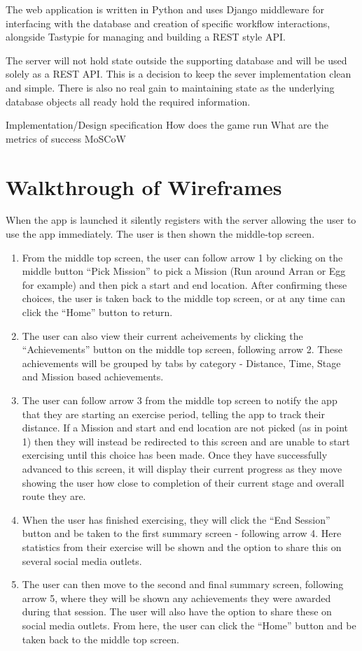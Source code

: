 The web application is written in Python and uses Django middleware
for interfacing with the database and creation of specific workflow
interactions, alongside Tastypie for managing and building a REST
style API.

The server will not hold state outside the supporting database and
will be used solely as a REST API. This is a decision to keep the
sever implementation clean and simple. There is also no real gain to
maintaining state as the underlying database objects all ready hold
the required information.

Implementation/Design specification
How does the game run
What are the metrics of success
MoSCoW


\section{Walkthrough of Wireframes}
When the app is launched it silently registers with the server
allowing the user to use the app immediately. The user is then shown
the middle-top screen.
\begin{enumerate}
  \item From the middle top screen, the user can follow arrow 1 by
    clicking on the middle button ``Pick Mission'' to pick a Mission
    (Run around Arran or Egg for example) and then pick a start and
    end location. After confirming these choices, the user is taken
    back to the middle top screen, or at any time can click the
    ``Home'' button to return. 
  \item The user can also view their current acheivements by clicking
    the ``Achievements'' button on the middle top screen, following
    arrow 2. These achievements will be grouped by tabs by category -
    Distance, Time, Stage and Mission based achievements.
  \item The user can follow arrow 3 from the middle top screen to
    notify the app that they are starting an exercise period, telling
    the app to track their distance. If a Mission and start and end
    location are not picked (as in point 1) then they will instead be
    redirected to this screen and are unable to start exercising until
    this choice has been made. Once they have successfully advanced to
    this screen, it will display their current progress as they move
    showing the user how close to completion of their current stage
    and overall route they are. 
  \item When the user has finished exercising, they will click the
    ``End Session'' button and be taken to the first summary screen -
    following arrow 4. Here statistics from their exercise will be
    shown and the option to share this on several social media
    outlets.
  \item The user can then move to the second and final summary screen,
    following arrow 5, where they will be shown any achievements they
    were awarded during that session. The user will also have the
    option to share these on social media outlets. From here, the user
    can click the ``Home'' button and be taken back to the middle top
    screen. 
\end{enumerate}

